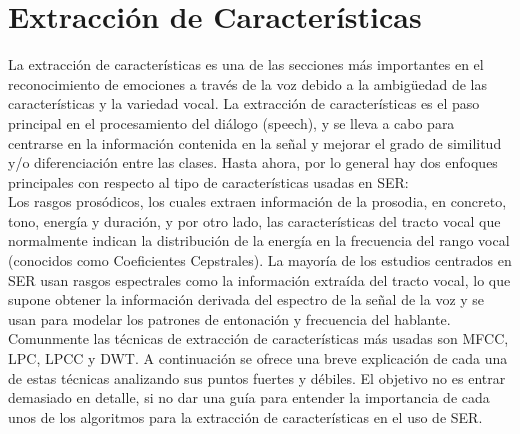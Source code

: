\documentclass[11pt,a4paper,spanish]{book}
\begin{document}
	\section{Extracción de Características}
	La extracción de características es una de las secciones más importantes en el reconocimiento de emociones a través de la voz debido a la ambigüedad de las características y la variedad vocal. La extracción de características es el paso principal en el procesamiento del diálogo (speech), y se lleva a cabo para centrarse en la información contenida en la señal y mejorar el grado de similitud y/o diferenciación entre las clases.\cite{Hellbernd2016} Hasta ahora, por lo general hay dos enfoques principales  con respecto al tipo de características usadas en SER:\\
	Los rasgos prosódicos, los cuales extraen información de la prosodia, en concreto, tono, energía y duración, y por otro lado, las características del tracto vocal que normalmente indican la distribución de la energía en la frecuencia del rango vocal (conocidos como Coeficientes Cepstrales).
	La mayoría de los estudios centrados en SER usan rasgos espectrales como la información extraída del tracto vocal, lo que supone obtener la información derivada del espectro de la señal de la voz y se usan para modelar los patrones de entonación y frecuencia del hablante\cite{Langari2020}.\\

	Comunmente las técnicas de extracción de características más usadas son 
	MFCC, LPC, LPCC y DWT. A continuación se ofrece una breve explicación de cada una de estas técnicas analizando sus puntos fuertes y débiles.\cite{Rashid2018} El objetivo no es entrar demasiado en detalle, si no dar una guía para entender la importancia de cada unos de los algoritmos para la extracción de características en el uso de SER.\hfill \break
	
\end{document}
